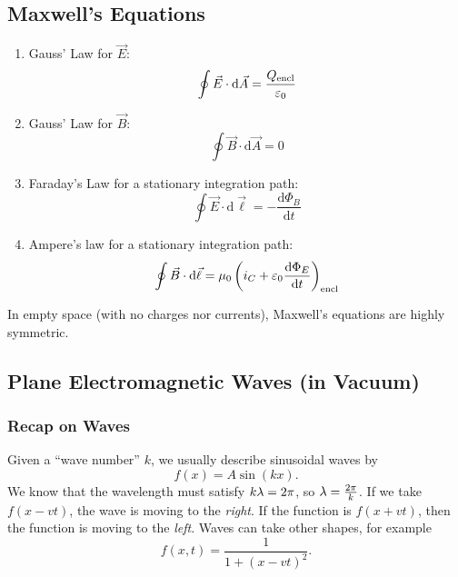 \documentclass[class=article, crop=false]{standalone}
\begin{document}
  \subsection{Maxwell's Equations}
  \begin{enumerate}
    \item Gauss' Law for $\vec{E}$:
    \[
      \oint \vec{E}\cdot \mathrm{d}\vec{A} = \frac{Q_\text{encl}}{\varepsilon_0}
    \]
    \item Gauss' Law for $\vec{B}$:
    \[
      \oint \vec{B}\cdot \mathrm{d}\vec{A} = 0
    \]
    \item Faraday's Law for a stationary integration path:
    \[
      \oint \vec{E}\cdot \mathrm{d}\vec{\ell} = -\frac{\mathrm{d}\Phi_B}{\mathrm{d}t}
    \]
    \item Ampere's law for a stationary integration path:
    \[
      \oint \vec{B}\cdot \mathrm{d}\vec{\ell} = \mu_0\left( i_C + \varepsilon_0 \frac{\mathrm{d}\Phi_E}{\mathrm{d}t} \right)_\text{encl}
    \]
  \end{enumerate}
  \begin{note}{}
    In empty space (with no charges nor currents), Maxwell's equations are highly symmetric.
  \end{note}
  \subsection{Plane Electromagnetic Waves (in Vacuum)}
  \subsubsection{Recap on Waves}
  Given a ``wave number'' $k$, we usually describe sinusoidal waves by
  \[
    f(x) = A\sin (kx).
  \]
  We know that the wavelength must satisfy $k\lambda = 2\pi$, so $\lambda = \frac{2\pi}{k}$. If we take $f(x - vt)$, the wave is moving to the \emph{right}. If the function is $f(x + vt)$, then the function is moving to the \emph{left}. Waves can take other shapes, for example
  \[
    f(x, t) = \frac{1}{1 + (x - vt)^2}. \tag{Moves to the right}
  \]
\end{document}
